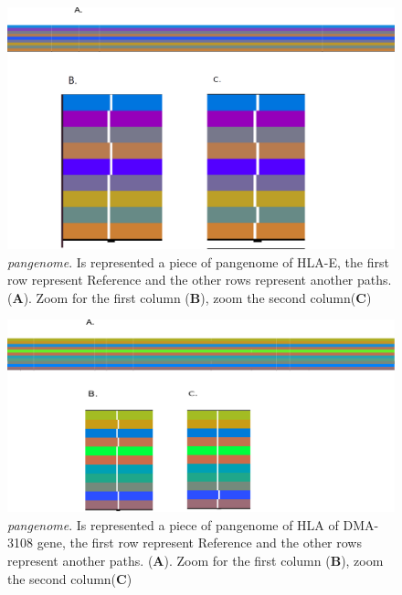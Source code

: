 \begin{figure}[H]
\centering
\includegraphics[width=1.10\textwidth]{fig/pangenomeHLA.png}
\decoRule
\caption{\textit{pangenome}. Is represented a piece of pangenome of HLA-E, the first row represent Reference and the other rows represent another paths. (\textbf{A}). Zoom for the first column  (\textbf{B}), zoom the second column(\textbf{C})}
\label{fig:hla-e.pdf}
\end{figure}



\begin{figure}[H]
\centering
\includegraphics[width=1.20\textwidth]{fig/DMA-3108.png}
\decoRule
\caption{\textit{pangenome}. Is represented a piece of pangenome of HLA of DMA-3108 gene, the first row represent Reference and the other rows represent another paths. (\textbf{A}). Zoom for the first column  (\textbf{B}), zoom the second column(\textbf{C})}
\label{fig:pangenome.pdf}
\end{figure}







